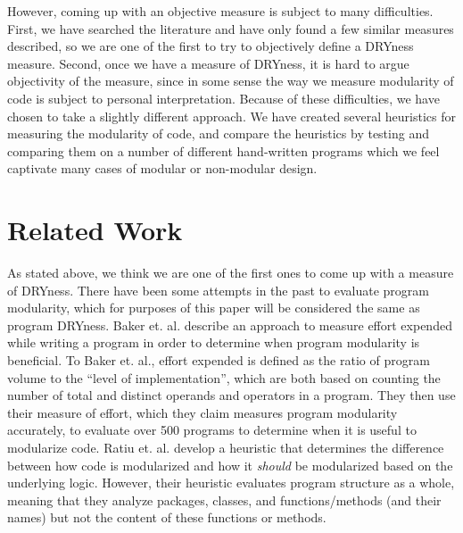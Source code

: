 \documentclass{article}
\begin{document}
However, coming up with an objective measure is subject to many difficulties. First, we have searched the literature and have only found a few similar measures described, so we are one of the first to try to objectively define a DRYness measure.
Second, once we have a measure of DRYness,
it is hard to argue objectivity of the measure, since in some sense the way we measure modularity of code is subject to personal
interpretation. Because of these difficulties, we have chosen to take a slightly different approach. We have created several 
heuristics for measuring the modularity of code, and compare the heuristics by testing and comparing them on a number of different
hand-written programs which we feel captivate many cases of modular or non-modular design.

\section{Related Work} As stated above, we think we are one of the first ones to come up with a measure of DRYness. There have been
some attempts in the past to evaluate program modularity, which for purposes of this paper will be considered the same as program DRYness.
Baker et. al.\cite{Modularity1979} describe an approach to measure effort expended while writing a program in order
to determine when program modularity is beneficial. To Baker et. al., effort expended is defined as the ratio of program volume to 
the ``level of implementation'', which are both based on counting the number of total and distinct operands and operators in a program.
They then use their measure of effort, which they claim measures program modularity accurately, to evaluate over 500 programs to
determine when it is useful to modularize code. Ratiu et. al.\cite{LogicalModularity} develop a heuristic that determines the 
difference between how code is modularized and how it \textit{should} be modularized based on the underlying logic. However, their heuristic
evaluates program structure as a whole, meaning that they analyze packages, classes, and functions/methods (and their names) but not the 
content of these functions or methods.
\end{document}
